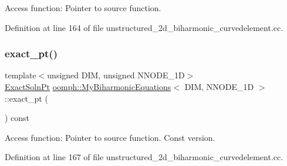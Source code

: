 Access function\+: Pointer to source function. 



Definition at line 164 of file unstructured\+\_\+2d\+\_\+biharmonic\+\_\+curvedelement.\+cc.

\mbox{\label{classoomph_1_1MyBiharmonicEquations_a6b2d15cfd6501f68a6d0e61f4c02eb99}} 
\subsubsection{\texorpdfstring{exact\+\_\+pt()}{exact\_pt()}\hspace{0.1cm}{\footnotesize\ttfamily [2/2]}}
{\footnotesize\ttfamily template$<$unsigned D\+IM, unsigned N\+N\+O\+D\+E\+\_\+1D$>$ \\
\hyperlink{classoomph_1_1MyBiharmonicEquations_a20238fec79ab67b90f3be58ea498e681}{Exact\+Soln\+Pt} \hyperlink{classoomph_1_1MyBiharmonicEquations}{oomph\+::\+My\+Biharmonic\+Equations}$<$ D\+IM, N\+N\+O\+D\+E\+\_\+1D $>$\+::exact\+\_\+pt (\begin{DoxyParamCaption}{ }\end{DoxyParamCaption}) const\hspace{0.3cm}{\ttfamily [inline]}}



Access function\+: Pointer to source function. Const version. 



Definition at line 167 of file unstructured\+\_\+2d\+\_\+biharmonic\+\_\+curvedelement.\+cc.

\mbox{\label{classoomph_1_1MyBiharmonicEquations_ad5ef6af62c0ebf27bacf62be8d408c8a}} 
